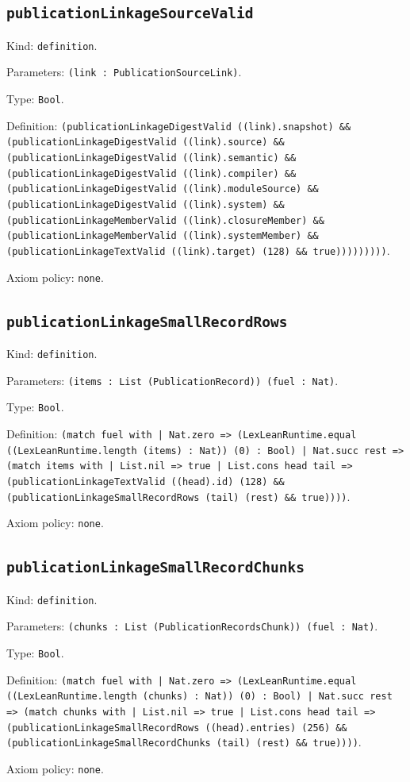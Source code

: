 \documentclass[11pt]{article}
\begin{document}
\subsection*{\texttt{publicationLinkageSourceValid}}
\noindent Kind: \texttt{definition}.\par
\noindent Parameters: \texttt{(link : PublicationSourceLink)}.\par
\noindent Type: \texttt{Bool}.\par
\noindent Definition: \texttt{(publicationLinkageDigestValid ((link).snapshot) \&\& (publicationLinkageDigestValid ((link).source) \&\& (publicationLinkageDigestValid ((link).semantic) \&\& (publicationLinkageDigestValid ((link).compiler) \&\& (publicationLinkageDigestValid ((link).moduleSource) \&\& (publicationLinkageDigestValid ((link).system) \&\& (publicationLinkageMemberValid ((link).closureMember) \&\& (publicationLinkageMemberValid ((link).systemMember) \&\& (publicationLinkageTextValid ((link).target) (128) \&\& true)))))))))}.\par
\noindent Axiom policy: \texttt{none}.\par
\subsection*{\texttt{publicationLinkageSmallRecordRows}}
\noindent Kind: \texttt{definition}.\par
\noindent Parameters: \texttt{(items : List (PublicationRecord)) (fuel : Nat)}.\par
\noindent Type: \texttt{Bool}.\par
\noindent Definition: \texttt{(match fuel with | Nat.zero => (LexLeanRuntime.equal ((LexLeanRuntime.length (items) : Nat)) (0) : Bool) | Nat.succ rest => (match items with | List.nil => true | List.cons head tail => (publicationLinkageTextValid ((head).id) (128) \&\& (publicationLinkageSmallRecordRows (tail) (rest) \&\& true))))}.\par
\noindent Axiom policy: \texttt{none}.\par
\subsection*{\texttt{publicationLinkageSmallRecordChunks}}
\noindent Kind: \texttt{definition}.\par
\noindent Parameters: \texttt{(chunks : List (PublicationRecordsChunk)) (fuel : Nat)}.\par
\noindent Type: \texttt{Bool}.\par
\noindent Definition: \texttt{(match fuel with | Nat.zero => (LexLeanRuntime.equal ((LexLeanRuntime.length (chunks) : Nat)) (0) : Bool) | Nat.succ rest => (match chunks with | List.nil => true | List.cons head tail => (publicationLinkageSmallRecordRows ((head).entries) (256) \&\& (publicationLinkageSmallRecordChunks (tail) (rest) \&\& true))))}.\par
\noindent Axiom policy: \texttt{none}.\par
\end{document}
